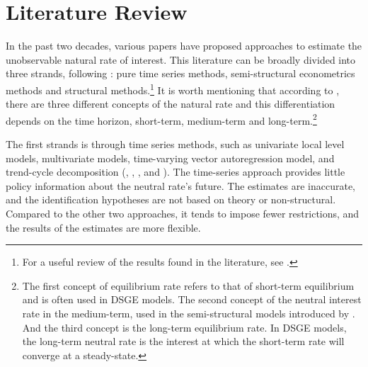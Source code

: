 \documentclass[12pt,oneside,a4paper]{article}
\begin{document}
%
%
\section{Literature Review}
In the past two decades, various papers have proposed approaches to estimate the unobservable natural rate of interest. This literature can be broadly divided into three strands, following \citet{Giammarioli:2004}: pure time series methods, semi-structural econometrics methods and structural methods.\footnote{For a useful review of the results found in the literature, see \citet{Brand:2018}. } It is worth mentioning that according to \citet{Wieland:2018}, there are three different concepts of the natural rate and this differentiation depends on the time horizon, short-term, medium-term and long-term.\footnote{The first concept of equilibrium rate refers to that of short-term equilibrium and is often used in DSGE models. The second concept of the neutral interest rate in the medium-term, used in the semi-structural models introduced by \citet{LW:2003}. And the third concept is the long-term equilibrium rate. In DSGE models, the long-term neutral rate is the interest at which the short-term rate will converge at a steady-state.}

The first strands is through time series methods, such as univariate local level models, multivariate models, time-varying vector autoregression model, and trend-cycle decomposition (\citet{Lubik:2015}, \citet{Hamilton:2016}, \citet{Johannsen:2018}, \citet{DelNegro:2019} and \citet{Rudebusch:2019}). The time-series approach provides little policy information about the neutral rate's future. The estimates are inaccurate, and the identification hypotheses are not based on theory or non-structural. Compared to the other two approaches, it tends to impose fewer restrictions, and the results of the estimates are more flexible.
\end{document}
